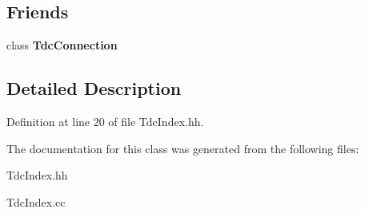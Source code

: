 \subsection*{Friends}
\begin{DoxyCompactItemize}
\item 
class {\bfseries TdcConnection}\label{classCALICE_1_1TdcIndex_ab85618aade64e98c6f7945f78e721566}

\end{DoxyCompactItemize}


\subsection{Detailed Description}


Definition at line 20 of file TdcIndex.hh.

The documentation for this class was generated from the following files:\begin{DoxyCompactItemize}
\item 
TdcIndex.hh\item 
TdcIndex.cc\end{DoxyCompactItemize}
